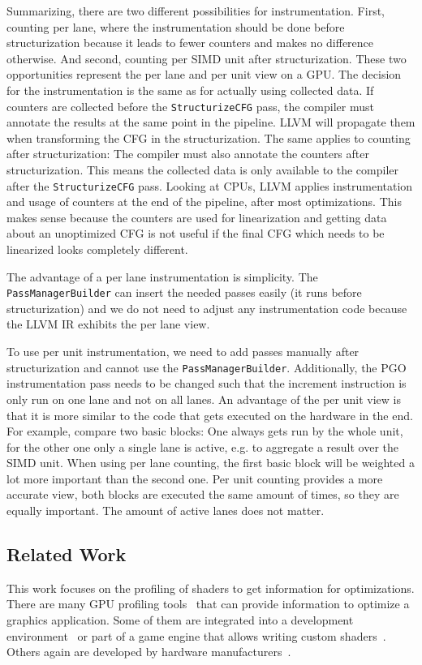 Summarizing, there are two different possibilities for instrumentation. First, counting per lane, where the instrumentation should be done before structurization because it leads to fewer counters and makes no difference otherwise.
And second, counting per SIMD unit after structurization.
These two opportunities represent the per lane and per unit view on a GPU.
The decision for the instrumentation is the same as for actually using collected data. If counters are collected before the \texttt{StructurizeCFG} pass, the compiler must annotate the results at the same point in the pipeline.
LLVM will propagate them when transforming the CFG in the structurization.
The same applies to counting after structurization: The compiler must also annotate the counters after structurization.
This means the collected data is only available to the compiler after the \texttt{StructurizeCFG} pass.
Looking at CPUs, LLVM applies instrumentation and usage of counters at the end of the pipeline, after most optimizations.
This makes sense because the counters are used for linearization and getting data about an unoptimized CFG is not useful if the final CFG which needs to be linearized looks completely different.

The advantage of a per lane instrumentation is simplicity. The \texttt{PassManagerBuilder} can insert the needed passes easily (it runs before structurization) and we do not need to adjust any instrumentation code because the LLVM IR exhibits the per lane view.

To use per unit instrumentation, we need to add passes manually after structurization and cannot use the \texttt{PassManagerBuilder}.
Additionally, the PGO instrumentation pass needs to be changed such that the increment instruction is only run on one lane and not on all lanes.
An advantage of the per unit view is that it is more similar to the code that gets executed on the hardware in the end.
For example, compare two basic blocks: One always gets run by the whole unit, for the other one only a single lane is active, e.g. to aggregate a result over the SIMD unit.
When using per lane counting, the first basic block will be weighted a lot more important than the second one.
Per unit counting provides a more accurate view, both blocks are executed the same amount of times, so they are equally important. The amount of active lanes does not matter.

\subsection{Related Work}
\label{sub:relatedwork}
This work focuses on the profiling of shaders to get information for optimizations.
There are many GPU profiling tools~\cite{PGI2014} that can provide information to optimize a graphics application.
Some of them are integrated into a development environment~\cite{MSGPUUsage} or part of a game engine that allows writing custom shaders~\cite{UnityGPUProfiler, UnrealGPUProfiling}.
Others again are developed by hardware manufacturers~\cite{NvidiaNsight, NvidiaShaderPerf, AMDShaderAnalyzer}.

